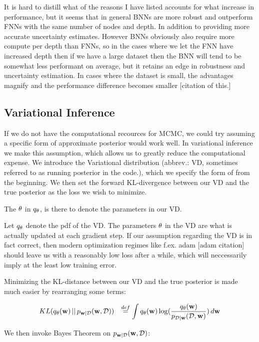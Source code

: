\documentclass[nofootinbib,UKenglish,nobalancelastpage,12pt]{article}
\newcommand{\vect}{\ensuremath{\mathbf}}
\begin{document}
It is hard to distill what of the reasons I have listed accounts for what increase in performance, but it seems that in general BNNs are more robust and outperform FNNs with the same number of nodes and depth. In addition to providing more accurate uncertainty estimates. However BNNs obviously also require more compute per depth than FNNs, so in the cases where we let the FNN have increased depth then if we have a large dataset then the BNN will tend to be somewhat less performant on average, but it retains an edge in robustness and uncertainty estimation. In cases where the dataset is small, the advantages magnify and the performance difference becomes smaller [citation of this.]

\subsection{Variational Inference}
If we do not have the computational recources for MCMC, we could try assuming a specific form of approximate posterior would work well. In variational inference we make this assumption, which allows us to greatly reduce the computational expense. We introduce the Variational distribution (abbrev.: VD, sometimes referred to as running posterior in the code.), which we specify the form of from the beginning. We then set the forward KL-divergence between our VD and the true posterior as the loss we wish to minimize.

The $\vect{\theta}$ in $q_{\vect{\theta}}$, is there to denote the parameters in our VD.

Let $q_{\vect{\theta}}$ denote the pdf of the VD. The parameters $\vect{\theta}$ in the VD are what is actually updated at each gradient step. If our assumption regarding the VD is in fact correct, then modern optimization regimes like f.ex. adam [adam citation] should leave us with a reasonably low loss after a while, which will neccessarily imply at the least low training error.

Minimizing the KL-distance between our VD and the true posterior is made much easier by rearranging some terms:

$$
\begin{aligned}
& K L(q_{\vect{\theta}}(\vect{w}) \, || \, p_{\vect{w}|\mathcal{D}}(\vect{w},\mathcal{D}))
& \stackrel{def}{=}\int q_{\vect{\theta}}(\vect{w}) \log (\frac{q_{\vect{\theta}}(\vect{w})}{p_{\mathcal{D}|\vect{w}}(\mathcal{D},\vect{w})}) \,d \vect{w}
\end{aligned}
$$

We then invoke Bayes Theorem on $p_{\vect{w}|\mathcal{D}}(\vect{w}, \mathcal{D})$:
\end{document}
